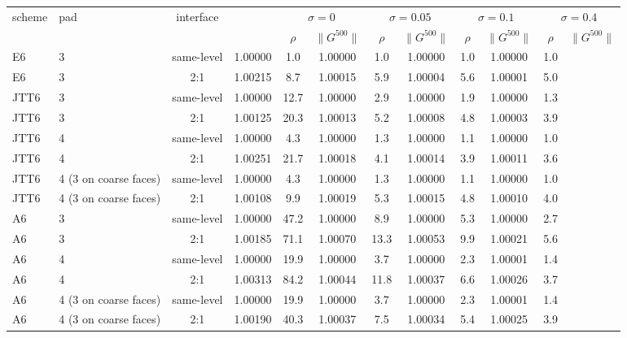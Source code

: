 \begin{tabular}{llcccccccccc}\toprule
 scheme & pad & interface & & \multicolumn{2}{c}{$\sigma=0$} & \multicolumn{2}{c}{$\sigma=0.05$} & \multicolumn{2}{c}{$\sigma=0.1$} & \multicolumn{2}{c}{$\sigma=0.4$}\\
 & & & & $\rho$ & $\|G^{500}\|$ & $\rho$ & $\|G^{500}\|$ & $\rho$ & $\|G^{500}\|$ & $\rho$ & $\|G^{500}\|$\\ \midrule
E6 & 3 & same-level & 1.00000 & 1.0 & 1.00000 & 1.0 & 1.00000 & 1.0 & 1.00000 & 1.0\\
E6 & 3 & 2:1 & 1.00215 & 8.7 & 1.00015 & 5.9 & 1.00004 & 5.6 & 1.00001 & 5.0\\
JTT6 & 3 & same-level & 1.00000 & 12.7 & 1.00000 & 2.9 & 1.00000 & 1.9 & 1.00000 & 1.3\\
JTT6 & 3 & 2:1 & 1.00125 & 20.3 & 1.00013 & 5.2 & 1.00008 & 4.8 & 1.00003 & 3.9\\
JTT6 & 4 & same-level & 1.00000 & 4.3 & 1.00000 & 1.3 & 1.00000 & 1.1 & 1.00000 & 1.0\\
JTT6 & 4 & 2:1 & 1.00251 & 21.7 & 1.00018 & 4.1 & 1.00014 & 3.9 & 1.00011 & 3.6\\
JTT6 & 4 (3 on coarse faces) & same-level & 1.00000 & 4.3 & 1.00000 & 1.3 & 1.00000 & 1.1 & 1.00000 & 1.0\\
JTT6 & 4 (3 on coarse faces) & 2:1 & 1.00108 & 9.9 & 1.00019 & 5.3 & 1.00015 & 4.8 & 1.00010 & 4.0\\
A6 & 3 & same-level & 1.00000 & 47.2 & 1.00000 & 8.9 & 1.00000 & 5.3 & 1.00000 & 2.7\\
A6 & 3 & 2:1 & 1.00185 & 71.1 & 1.00070 & 13.3 & 1.00053 & 9.9 & 1.00021 & 5.6\\
A6 & 4 & same-level & 1.00000 & 19.9 & 1.00000 & 3.7 & 1.00000 & 2.3 & 1.00001 & 1.4\\
A6 & 4 & 2:1 & 1.00313 & 84.2 & 1.00044 & 11.8 & 1.00037 & 6.6 & 1.00026 & 3.7\\
A6 & 4 (3 on coarse faces) & same-level & 1.00000 & 19.9 & 1.00000 & 3.7 & 1.00000 & 2.3 & 1.00001 & 1.4\\
A6 & 4 (3 on coarse faces) & 2:1 & 1.00190 & 40.3 & 1.00037 & 7.5 & 1.00034 & 5.4 & 1.00025 & 3.9\\
\bottomrule\end{tabular}

